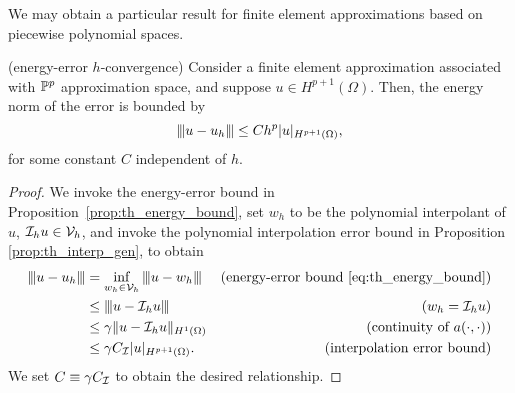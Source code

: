 We may obtain a particular result for finite element approximations based on piecewise polynomial spaces.
\begin{proposition}(energy-error $h$-convergence)
  \label{prop:th_energy_bound_poly}
  Consider a finite element approximation associated with $\mathbb{P}^p$ approximation space, and suppose $u \in H^{p+1}(\Omega)$.  Then, the energy norm of the error is bounded by
  \begin{equation*}
    |\kern-1pt|\kern-1pt| u - u_h |\kern-1pt|\kern-1pt| \leq C h^p | u |_{H^{p+1}(\Omega)},
  \end{equation*}
  for some constant $C$ independent of $h$.
  \begin{proof}
    We invoke the energy-error bound in Proposition~\eqref{prop:th_energy_bound}, set $w_h$ to be the polynomial interpolant of $u$, $\mathcal{I}_h u \in \mathcal{V}_h$, and invoke the polynomial interpolation error bound in Proposition \ref{prop:th_interp_gen}, to obtain
    \begin{align*}
      |\kern-1pt|\kern-1pt|  u - u_h  |\kern-1pt|\kern-1pt| &= \inf_{w_h \in \mathcal{V}_h} |\kern-1pt|\kern-1pt|  u - w_h  |\kern-1pt|\kern-1pt|
      & \text{(energy-error bound \eqref{eq:th_energy_bound})}  \\
      &\leq |\kern-1pt|\kern-1pt|  u - \mathcal{I}_h u  |\kern-1pt|\kern-1pt| &\text{($w_h = \mathcal{I}_h u$)} \\
      &\leq \gamma \| u - \mathcal{I}_h u \|_{H^1(\Omega)} &\text{(continuity of $a(\cdot,\cdot)$)} \\
      &\leq \gamma C_{\mathcal{I}} | u |_{H^{p+1}(\Omega)}. &\text{(interpolation error bound)}
    \end{align*}
    We set $C \equiv \gamma C_{\mathcal{I}}$ to obtain the desired relationship.
  \end{proof}
\end{proposition}

